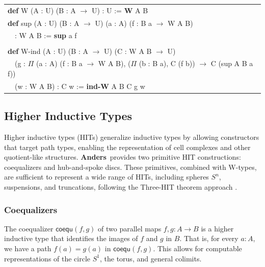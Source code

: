 \documentclass[a4paper,UKenglish,cleveref, autoref, thm-restate]{lipics-v2021}
\newcommand{\tabstyle}[0]{\scriptsize\ttfamily\fontseries{l}\selectfont}
\newcommand{\anders}[0]{\textbf{Anders}}
\begin{document}
\begin{table}[ht!]
\tabstyle
\begin{tabular}{l}
\textbf{def} W (A : U) (B : A $\rightarrow$ U) : U := \textbf{W} A B \\
\textbf{def} sup (A : U) (B : A $\rightarrow$ U) (a : A) (f : B a $\rightarrow$ W A B) \\
\ \ : W A B := \textbf{sup} a f \\
\\
\textbf{def} W-ind (A : U) (B : A $\rightarrow$ U) (C : W A B $\rightarrow$ U) \\
\ \ (g : $\Pi$ (a : A) (f : B a $\rightarrow$ W A B), ($\Pi$ (b : B a), C (f b)) $\rightarrow$ C (sup A B a f)) \\
\ \ (w : W A B) : C w := \textbf{ind-W} A B C g w
\end{tabular}
\end{table}

\newpage
\subsection{Higher Inductive Types}

Higher inductive types (HITs) generalize inductive types by allowing constructors that target path types, enabling the representation of cell complexes and other quotient-like structures. \anders\ provides two primitive HIT constructions: coequalizers and hub-and-spoke discs. These primitives, combined with W-types, are sufficient to represent a wide range of HITs, including spheres $S^n$, suspensions, and truncations, following the Three-HIT theorem approach \cite{BauerWeide}.

\subsubsection*{Coequalizers}

The coequalizer $\mathsf{coequ}(f, g)$ of two parallel maps $f, g : A \to B$ is a higher inductive type that identifies the images of $f$ and $g$ in $B$. That is, for every $a : A$, we have a path $f(a) = g(a)$ in $\mathsf{coequ}(f, g)$. This allows for computable representations of the circle $S^1$, the torus, and general colimits.
\end{document}

